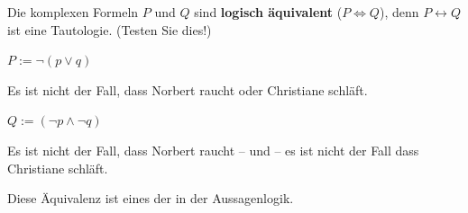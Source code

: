 %
%
%
%
%	
%	
%
%
%

\begin{frame}

Die komplexen Formeln $P$ und $Q$ sind \textbf{logisch äquivalent} ($P \Leftrightarrow Q$), denn $P \leftrightarrow Q$ ist eine Tautologie. (Testen Sie dies!)

\begin{exe}
	
	 $P := \lnot (p \lor q)$

	Es ist nicht der Fall, dass Norbert raucht oder Christiane schläft.
	
	 $Q := (\lnot p \land \lnot q)$
	
	Es ist nicht der Fall, dass Norbert raucht -- und -- es ist nicht der Fall dass Christiane schläft.	

\end{exe}

Diese Äquivalenz ist eines der  in der Aussagenlogik.

\end{frame}


